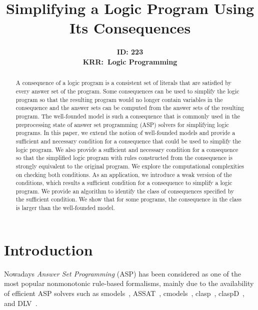 \documentclass{article}
\title{Simplifying a Logic Program Using Its Consequences}
\author{\textbf{ID: 223}\\
        \textbf{KRR:~Logic Programming}
}
\begin{document}
\maketitle

\begin{abstract}
A consequence of a logic program is a consistent set of literals that are satisfied by every answer set of the program.
Some consequences can be used to simplify the logic program so that the resulting program would no longer contain variables in the consequence and the answer sets can be computed from the answer sets of the resulting program. The well-founded model is such a consequence that is commonly used in the preprocessing state of answer set programming (ASP) solvers for simplifying logic programs.
In this paper, we extend the notion of well-founded models and provide a sufficient and necessary condition for a consequence that could be used to simplify the logic program. We also provide a sufficient and necessary condition for a consequence so that the simplified logic program with rules constructed from the consequence is strongly equivalent to the original program.
We explore the computational complexities on checking both conditions. As an application, we introduce a weak version of the conditions, which results a sufficient condition for a consequence to simplify a logic program. We provide an algorithm to identify the class of consequences specified by the sufficient condition.
We show that for some programs, the consequence in the class is larger than the well-founded model.
\end{abstract}

\section{Introduction}

Nowadays {\em Answer Set Programming} (ASP) has been considered as one of the most popular nonmonotonic rule-based formalisms, mainly due to the availability of efficient ASP solvers such as smodels~\cite{syrjanen2001smodels}, ASSAT~\cite{lin2004assat}, cmodels~\cite{lierler2004cmodels}, clasp~\cite{gebser2007clasp}, claspD~\cite{drescher2008conflict}, and DLV~\cite{leone2002dlv}.
\end{document}
